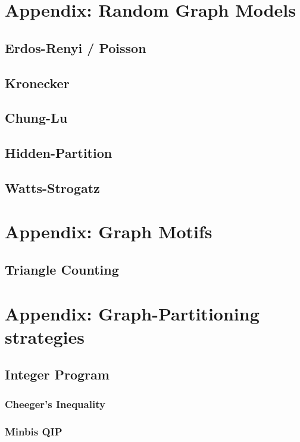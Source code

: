 \documentclass[11pt]{article}
\begin{document}
\section{Appendix: Random Graph Models}
\subsection{Erdos-Renyi / Poisson}

\subsection{Kronecker}
\cite{leskovec2007scalable}

\subsection{Chung-Lu}
\cite{chung2004average}

\subsection{Hidden-Partition}
\cite{Condon99algorithmsfor}

\subsection{Watts-Strogatz}
\cite{Watts1998}

\section{Appendix: Graph Motifs}
\subsection{Triangle Counting}


\section{Appendix: Graph-Partitioning strategies}

\subsection{Integer Program}
\subsubsection{Cheeger's Inequality}
\subsubsection{Minbis QIP}
\end{document}

